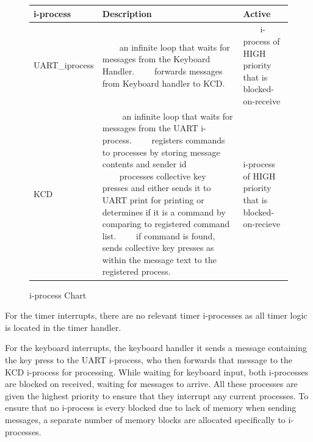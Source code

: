 \documentclass[11pt, oneside]{article}
\newcommand{\tabitem}{~~\llap{\textbullet}~~}
\begin{document}
\begin{figure}[ht!]
\centering
\begin{tabular}{|L{3cm}|L{8cm}|L{3cm}|} \hline
\textbf{i-process}& Description & Active \\ \hline
UART\_iprocess& 
\tabitem an infinite loop that waits for messages from the Keyboard Handler.
\newline 
\tabitem forwards messages from Keyboard handler to KCD.
 & \tabitem i-process of HIGH priority that is blocked-on-receive
 \newline
  \\ \hline
KCD& 
\tabitem
an infinite loop that waits for messages from the UART i-process.
\newline
\tabitem registers commands to processes by storing message contents and sender id
\newline
\tabitem processes collective key presses and either sends it to UART print for printing or determines if it is a command by comparing to registered command list.
\newline
\tabitem if command is found, sends collective key presses as within the message text to the registered process.
 & i-process of HIGH priority that is blocked-on-recieve \\ \hline
\end{tabular}
\caption{i-process Chart\label{overflow}}
\end{figure}

For the timer interrupts, there are no relevant timer i-processes as all timer logic is located in the timer handler. 

For the keyboard interrupts, the keyboard handler it sends a message containing the key press to the UART i-process, who then forwards that message to the KCD i-process for processing. While waiting for keyboard input, both i-processes are blocked on received, waiting for messages to arrive. All these processes are given the highest priority to ensure that they interrupt any current processes. To ensure that no i-process is every blocked due to lack of memory when sending messages, a separate number of memory blocks are allocated specifically to i-processes.
\end{document}
